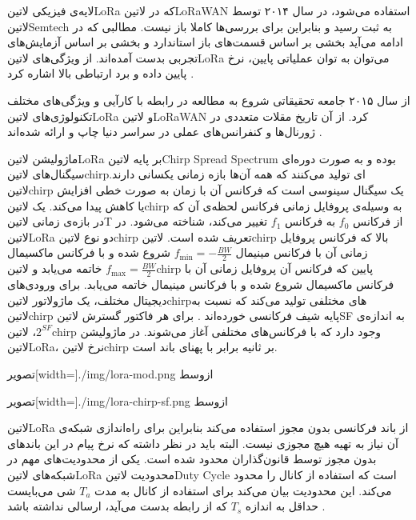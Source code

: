 
لایه‌ی فیزیکی ‌لاتین{LoRa} که در ‌لاتین{LoRaWAN} استفاده می‌شود، در سال ۲۰۱۴ توسط ‌لاتین{Semtech} به ثبت رسید
و بنابراین برای بررسی‌ها کاملا باز نیست. مطالبی که در ادامه می‌آید بخشی بر اساس قسمت‌های باز استاندارد و بخشی بر اساس آزمایش‌های
تجربی بدست آمده‌اند.
از ویژگی‌های ‌لاتین{LoRa} می‌توان به توان عملیاتی پایین، نرخ پایین داده و برد ارتباطی بالا اشاره کرد
.

از سال ۲۰۱۵ جامعه تحقیقاتی شروع به مطالعه در رابطه با کارآیی و ویژگی‌های مختلف تکنولوژی‌های ‌لاتین{LoRa} و ‌لاتین{LoRaWAN} کرد.
از آن تاریخ مقلات متعددی در ژورنال‌ها و کنفرانس‌های عملی در سراسر دنیا چاپ و ارائه شده‌اند
.

ماژولیشن ‌لاتین{LoRa} بر پایه ‌لاتین{Chirp Spread Spectrum} بوده و به صورت دوره‌ای سیگنال‌های ‌لاتین{chirp}ای تولید می‌کنند که همه آن‌ها بازه زمانی یکسانی دارند.
‌لاتین{chirp} یک سیگنال سینوسی است که فرکانس آن با زمان به صورت خطی افزایش یا کاهش پیدا می‌کند.
یک ‌لاتین{chirp} به وسیله‌ی پروفایل زمانی فرکانس لحظه‌ی آن که در بازه‌ی زمانی ‌لاتین{T} از فرکانس $f_0$ به فرکانس $f_1$
تغییر می‌کند، شناخته می‌شود.
در ‌لاتین{LoRa} دو نوع ‌لاتین{chirp} تعریف شده است. ‌لاتین{chirp} بالا که فرکانس پروفایل زمانی آن با فرکانس مینیمال
\(f_{\min} = -\frac{BW}{2}\)
شروع شده و با فرکانس ماکسیمال
\(f_{\max} = \frac{BW}{2}\)
خاتمه می‌یابد و ‌لاتین{chirp} پایین که فرکانس آن پروفایل زمانی آن با فرکانس ماکسیمال
شروع شده و با فرکانس مینیمال خاتمه می‌یابد.
برای ورودی‌های دیجیتال مختلف، یک ماژولاتور ‌لاتین{chirp}های مختلفی تولید می‌کند که نسبت به ‌لاتین{chirp} پایه شیف فرکانسی خورده‌اند
 .
برای هر فاکتور گسترش ‌لاتین{SF} به اندازه‌ی $2^{SF}$، ‌لاتین{chirp} وجود دارد که با فرکانس‌های مختلفی آغاز می‌شوند.
در ماژولیشن ‌لاتین{LoRa}، نرخ ‌لاتین{chirp} بر ثانیه برابر با پهنای باند است.

‌تصویر[width=\textwidth]{./img/lora-mod.png}
‌ازوسط

‌تصویر[width=\textwidth]{./img/lora-chirp-sf.png}
‌ازوسط

‌لاتین{LoRa} از باند فرکانسی بدون مجوز استفاده می‌کند بنابراین برای راه‌اندازی شبکه‌ی آن نیاز به تهیه هیچ مجوزی نیست. البته باید در نظر داشته که نرخ پیام در این باندهای بدون مجوز توسط قانون‌گذاران محدود شده است.
یکی از محدودیت‌های مهم در شبکه‌های ‌لاتین{LoRa} محدودیت ‌لاتین{Duty Cycle} است که استفاده از کانال را محدود می‌کند. این محدودیت بیان می‌کند برای استفاده از کانال به مدت $T_{a}$ شی می‌بایست
حداقل به اندازه $T_{s}$ که از رابطه  بدست می‌آید، ارسالی نداشته باشد
.

